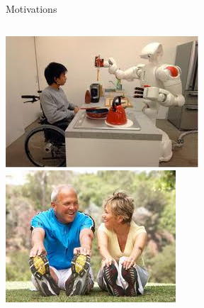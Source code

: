 \documentclass[final]{beamer}
\begin{document}
\begin{frame}
\begin{columns}
\begin{column}{.49\textwidth}
\begin{block}{Motivations}
\begin{columns}
\begin{column}{.39\textwidth}
\-
                    \includegraphics[width=0.95\linewidth]{images/viola/disabilities}
\-                                                                                  
		    \includegraphics[width=0.95\linewidth]{images/viola/exercise}
\-
                \end{column}
              \end{columns}
            \end{block}

    \end{column}
  \end{columns}
  

\end{frame}
\end{document}
